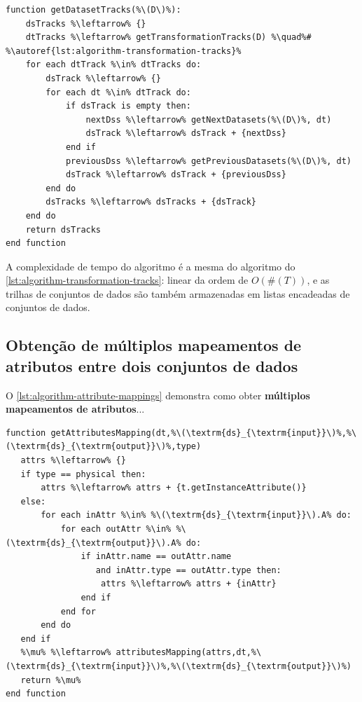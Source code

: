 \begin{minipage}[c]{0.95\textwidth}
\begin{lstlisting}[language=pseudocode,label={lst:algorithm-dataset-tracks},caption={[Detecção das trilhas de conjuntos de dados]Detecção do rastro do fluxo de dados no nível de trilhas de conjuntos de dados.}]
function getDatasetTracks(%\(D\)%):
    dsTracks %\leftarrow% {}
    dtTracks %\leftarrow% getTransformationTracks(D) %\quad%# %\autoref{lst:algorithm-transformation-tracks}%
    for each dtTrack %\in% dtTracks do:
        dsTrack %\leftarrow% {}
        for each dt %\in% dtTrack do:
            if dsTrack is empty then:
                nextDss %\leftarrow% getNextDatasets(%\(D\)%, dt)
                dsTrack %\leftarrow% dsTrack + {nextDss}
            end if
            previousDss %\leftarrow% getPreviousDatasets(%\(D\)%, dt)
            dsTrack %\leftarrow% dsTrack + {previousDss}
        end do
        dsTracks %\leftarrow% dsTracks + {dsTrack}
    end do
    return dsTracks
end function
\end{lstlisting}
\end{minipage}

A complexidade de tempo do algoritmo é a mesma do algoritmo do \autoref{lst:algorithm-transformation-tracks}: linear da ordem de \( O(\#(T)) \), e as trilhas de conjuntos de dados são também armazenadas em listas encadeadas de conjuntos de dados.

\subsection{Obtenção de múltiplos mapeamentos de atributos entre dois conjuntos de dados}

O \autoref{lst:algorithm-attribute-mappings} demonstra como obter \textbf{múltiplos mapeamentos de atributos}...


\begin{minipage}[c]{0.95\textwidth}
\begin{lstlisting}[language=pseudocode,label={lst:algorithm-attribute-mappings},caption={[Obtenção de múltiplos mapeamentos de atributos]Obtenção de múltiplos mapeamentos de atributos entre dois conjuntos de dados adjacentes.}]
function getAttributesMapping(dt,%\(\textrm{ds}_{\textrm{input}}\)%,%\(\textrm{ds}_{\textrm{output}}\)%,type)
   attrs %\leftarrow% {}
   if type == physical then:
       attrs %\leftarrow% attrs + {t.getInstanceAttribute()}
   else:
       for each inAttr %\in% %\(\textrm{ds}_{\textrm{input}}\).A% do:
           for each outAttr %\in% %\(\textrm{ds}_{\textrm{output}}\).A% do:
               if inAttr.name == outAttr.name
                  and inAttr.type == outAttr.type then:
                   attrs %\leftarrow% attrs + {inAttr}
               end if
           end for
       end do
   end if
   %\mu% %\leftarrow% attributesMapping(attrs,dt,%\(\textrm{ds}_{\textrm{input}}\)%,%\(\textrm{ds}_{\textrm{output}}\)%)
   return %\mu%
end function
\end{lstlisting}
\end{minipage}

